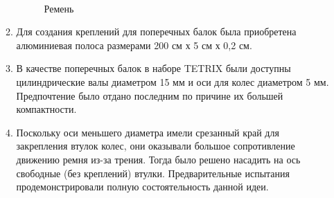 \begin{enumerate}
\begin{enumerate}
	  \begin{figure}[H]
	  	\begin{minipage}[h]{0.2\linewidth}
	  		\center  
	  	\end{minipage}
	  	\begin{minipage}[h]{0.6\linewidth}
	  		\caption{Ремень}
	  	\end{minipage}
	  \end{figure}
      
      \item  Для создания креплений для поперечных балок была приобретена алюминиевая полоса размерами 200 см х 5 см х 0,2 см.\newline
      
      \item В качестве поперечных балок в наборе TETRIX были доступны цилиндрические валы диаметром 15 мм и оси для колес диаметром 5 мм. Предпочтение было отдано последним по причине их большей компактности.\newline
       
      \item Поскольку оси меньшего диаметра имели срезанный край для закрепления втулок колес, они оказывали большое сопротивление движению ремня из-за трения. Тогда было решено насадить на ось свободные (без креплений) втулки. Предварительные испытания продемонстрировали полную состоятельность данной идеи.\newline
        

\end{enumerate}
\end{enumerate}
